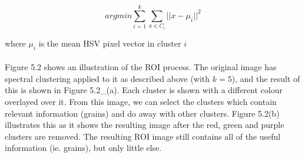 \begin{equation}
argmin \sum_{i=1}^{k}\sum_{x\in C_i} ||x - \mu_i||^2
\end{equation}

where $\mu_i$ is the mean HSV pixel vector in cluster $i$\\ \\
%
Figure 5.2 shows an illustration of the ROI process. The original image has spectral clustering applied to it as described above (with $k = 5$), and the result of this is shown in Figure 5.2\_(a). Each cluster is shown with a different colour overlayed over it. From this image, we can select the clusters which contain relevant information (grains) and do away with other clusters. Figure 5.2(b) illustrates this as it shows the resulting image after the red, green and purple clusters are removed. The resulting ROI image still contains all of the useful information (ie. grains), but only little else.
